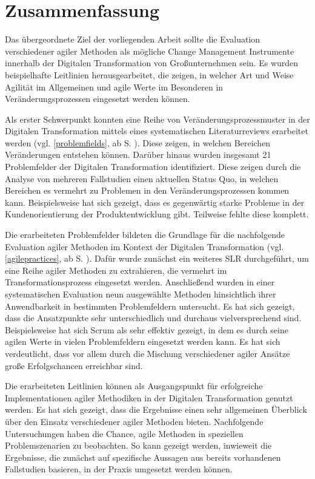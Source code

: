 \chapter{Zusammenfassung}
\label{conclusion}

Das übergeordnete Ziel der vorliegenden Arbeit sollte die Evaluation verschiedener agiler Methoden als mögliche Change Management Instrumente innerhalb der Digitalen Transformation von Großunternehmen sein. Es wurden beispielhafte Leitlinien herausgearbeitet, die zeigen, in welcher Art und Weise Agilität im Allgemeinen und agile Werte im Besonderen in Veränderungsprozessen eingesetzt werden können.

Als erster Schwerpunkt konnten eine Reihe von Veränderungsprozessmuster in der Digitalen Transformation mittels eines systematischen Literaturreviews erarbeitet werden (vgl. \ref{problemfields}, ab S. \pageref{problemfields}). Diese zeigen, in welchen Bereichen Veränderungen entstehen können. Darüber hinaus wurden insgesamt 21 Problemfelder der Digitalen Transformation identifiziert. Diese zeigen durch die Analyse von mehreren Fallstudien einen aktuellen Status Quo, in welchen Bereichen es vermehrt zu Problemen in den Veränderungsprozessen kommen kann. Beispielsweise hat sich gezeigt, dass es gegenwärtig starke Probleme in der Kundenorientierung der Produktentwicklung gibt. Teilweise fehlte diese komplett.

Die erarbeiteten Problemfelder bildeten die Grundlage für die nachfolgende Evaluation agiler Methoden im Kontext der Digitalen Transformation (vgl.  \ref{agilepractices}, ab S. \pageref{agilepractices}). Dafür wurde zunächst ein weiteres SLR durchgeführt, um eine Reihe agiler Methoden zu extrahieren, die vermehrt im Transformationsprozess eingesetzt werden. Anschließend wurden in einer systematischen Evaluation neun ausgewählte Methoden hinsichtlich ihrer Anwendbarkeit in bestimmten Problemfeldern untersucht. Es hat sich gezeigt, dass die Ansatzpunkte sehr unterschiedlich und durchaus vielversprechend sind. Beispielsweise hat sich Scrum als sehr effektiv gezeigt, in dem es durch seine agilen Werte in vielen Problemfeldern eingesetzt werden kann. Es hat sich verdeutlicht, dass vor allem durch die Mischung verschiedener agiler Ansätze große Erfolgschancen erreichbar sind.

Die erarbeiteten Leitlinien können als Ausgangspunkt für erfolgreiche Implementationen agiler Methodiken in der Digitalen Transformation genutzt werden. Es hat sich gezeigt, dass die Ergebnisse einen sehr allgemeinen Überblick über den Einsatz verschiedener agiler Methoden bieten. Nachfolgende Untersuchungen haben die Chance, agile Methoden in speziellen Problemszenarien zu beobachten. So kann gezeigt werden, inwieweit die Ergebnisse, die zunächst auf spezifische Aussagen aus bereits vorhandenen Fallstudien basieren, in der Praxis umgesetzt werden können. 

